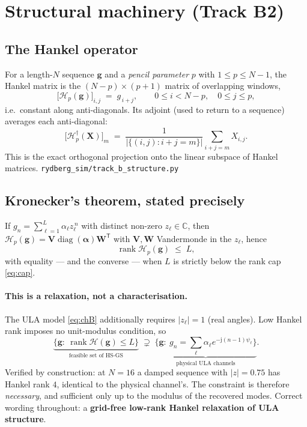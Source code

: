 \documentclass[11pt,a4paper]{article}
\newcommand{\src}[1]{{\footnotesize\color{srcgray}\texttt{#1}}}
\newcommand{\C}{\mathbb{C}}
\newcommand{\trans}{\mathsf{T}}
\newcommand{\mat}[1]{\mathbf{#1}}
\newcommand{\vect}[1]{\mathbf{#1}}
\newcommand{\jj}{\mathrm{j}}
\newcommand{\Hop}{\mathcal{H}}
\newcommand{\rank}{\operatorname{rank}}
\newcommand{\diag}{\operatorname{diag}}
\begin{document}
\section{Structural machinery (Track B2)}\label{sec:hankel}

\subsection{The Hankel operator}
For a length-$N$ sequence $\vect{g}$ and a \emph{pencil parameter} $p$ with
$1\le p\le N-1$, the Hankel matrix is the $(N-p)\times(p+1)$ matrix of
overlapping windows,
\begin{equation}
\bigl[\Hop_p(\vect{g})\bigr]_{i,j} \;=\; g_{\,i+j},
\qquad 0\le i< N-p,\quad 0\le j\le p ,
\label{eq:hankel}
\end{equation}
i.e.\ constant along anti-diagonals. Its adjoint (used to return to a
sequence) averages each anti-diagonal:
\begin{equation}
\bigl[\Hop_p^{\dagger}(\mat{X})\bigr]_m
\;=\;
\frac{1}{|\{(i,j):i+j=m\}|}\sum_{i+j=m} X_{i,j} .
\label{eq:antidiag}
\end{equation}
This is the exact orthogonal projection onto the linear subspace of Hankel
matrices. \src{rydberg\_sim/track\_b\_structure.py}

\subsection{Kronecker's theorem, stated precisely}
If $g_n=\sum_{\ell=1}^{L}\alpha_\ell z_\ell^{\,n}$ with distinct non-zero
$z_\ell\in\C$, then $\Hop_p(\vect{g})=\mat{V}\diag(\boldsymbol{\alpha})\mat{W}^{\trans}$
with $\mat{V},\mat{W}$ Vandermonde in the $z_\ell$, hence
\begin{equation}
\rank \Hop_p(\vect{g}) \;\le\; L ,
\label{eq:kron}
\end{equation}
with equality --- and the converse --- when $L$ is strictly below the rank cap
\eqref{eq:cap}.

\paragraph{This is a relaxation, not a characterisation.} The ULA model
\eqref{eq:chB} additionally requires $|z_\ell|=1$ (real angles). Low Hankel
rank imposes no unit-modulus condition, so
\begin{equation}
\underbrace{\bigl\{\vect{g}:\ \rank\Hop(\vect{g})\le L\bigr\}}_{\text{feasible set of HS-GS}}
\;\supsetneq\;
\underbrace{\bigl\{\vect{g}:\ g_n=\textstyle\sum_\ell\alpha_\ell e^{-\jj(n-1)\psi_\ell}\bigr\}}_{\text{physical ULA channels}} .
\label{eq:relaxation}
\end{equation}
Verified by construction: at $N=16$ a damped sequence with $|z|=0.75$ has
Hankel rank $4$, identical to the physical channel's. The constraint is
therefore \emph{necessary}, and sufficient only up to the modulus of the
recovered modes. Correct wording throughout: a \textbf{grid-free low-rank
Hankel relaxation of ULA structure}.
\end{document}
